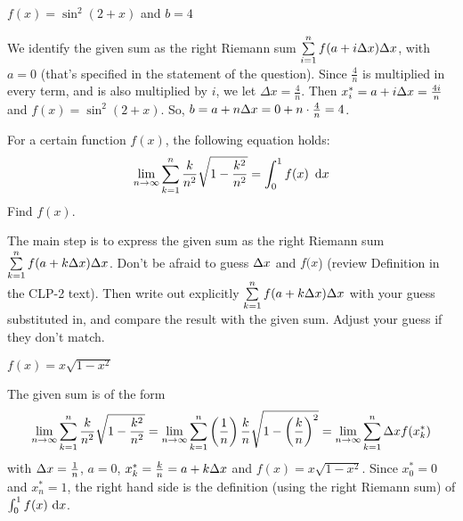 \begin{answer}
$f(x) = \sin^2 (2 + x)$ and $b=4$
\end{answer}

\begin{solution}
We identify the given sum as the right Riemann sum
$\sum\limits_{i=1}^{n} f(a+i\Delta x)\Delta  x$,
with $a=0$ (that's specified in the statement of the question). Since $\frac{4}{n}$ is multiplied in every term, and is also multiplied by $i$, we let
 $\Delta x = \frac{4}{n}$. Then $x_i^* = a+i\Delta x=\frac{4i}{n}$
and $f(x) = \sin^2 (2 + x)$. So, $b=a+n\Delta x=0+n\cdot\frac{4}{n}=4$.
\end{solution}

\begin{Mquestion}[M105 2102A]
For a certain function $f(x)$, the following equation holds:
\begin{equation*}
\lim_{n\rightarrow\infty}\sum\limits_{k=1}^n
\frac{k}{n^2}\sqrt{1-\frac{k^2}{n^2}}
=\int_0^1 f(x)\ \,\mathrm{d}x
\end{equation*}
Find $f(x)$.
\end{Mquestion}

\begin{hint}
The main step is to express the given sum as the right Riemann sum
$\sum\limits_{k=1}^{n} f(a+k\Delta x)\Delta  x$.
Don't be afraid to guess $\Delta x$ and $f(x$)
(review Definition   in the
CLP-2 text).
Then write out explicitly $ \sum\limits_{k=1}^{n} f(a+k\Delta x)\Delta  x$
with your guess substituted in, and compare the result with the given sum.  Adjust your guess if they don't match.
\end{hint}

\begin{answer}
$f(x)=x\sqrt{1-x^2}$
\end{answer}

\begin{solution}
The given sum is of the form
\begin{align*}
\lim_{n\rightarrow\infty}\sum_{k=1}^n
             \frac{k}{n^2}\sqrt{1-\frac{k^2}{n^2}}
=\lim_{n\rightarrow\infty}\sum_{k=1}^n
            \left(\frac{1}{n}\right) \frac{k}{n}\sqrt{1-\left(\frac{k}{n}\right)^2}
=\lim_{n\rightarrow\infty}\sum_{k=1}^n \Delta x f(x_k^*)
\end{align*}
with $\Delta x=\frac{1}{n}$, $a=0$, $x_k^*=\frac{k}{n}=a+k\Delta x$
and $f(x)=x\sqrt{1-x^2}$.
Since $x_0^*=0$ and $x_n^*=1$, the right hand side is the definition
(using the right Riemann sum) of
$
\int_0^1 f(x)\,\,\mathrm{d}x
$.

\end{solution}


